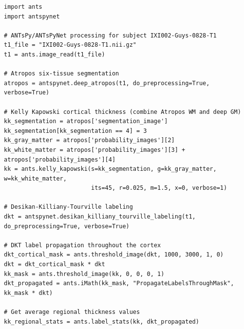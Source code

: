 \documentclass[
  12pt,
]{article}
\begin{document}
\vspace{10mm}


\begin{lstlisting}
import ants
import antspynet

# ANTsPy/ANTsPyNet processing for subject IXI002-Guys-0828-T1
t1_file = "IXI002-Guys-0828-T1.nii.gz"
t1 = ants.image_read(t1_file)

# Atropos six-tissue segmentation
atropos = antspynet.deep_atropos(t1, do_preprocessing=True, verbose=True)

# Kelly Kapowski cortical thickness (combine Atropos WM and deep GM)
kk_segmentation = atropos['segmentation_image']
kk_segmentation[kk_segmentation == 4] = 3
kk_gray_matter = atropos['probability_images'][2]
kk_white_matter = atropos['probability_images'][3] + atropos['probability_images'][4]
kk = ants.kelly_kapowski(s=kk_segmentation, g=kk_gray_matter, w=kk_white_matter,
                         its=45, r=0.025, m=1.5, x=0, verbose=1)

# Desikan-Killiany-Tourville labeling
dkt = antspynet.desikan_killiany_tourville_labeling(t1, do_preprocessing=True, verbose=True)

# DKT label propagation throughout the cortex
dkt_cortical_mask = ants.threshold_image(dkt, 1000, 3000, 1, 0)
dkt = dkt_cortical_mask * dkt
kk_mask = ants.threshold_image(kk, 0, 0, 0, 1)
dkt_propagated = ants.iMath(kk_mask, "PropagateLabelsThroughMask", kk_mask * dkt)

# Get average regional thickness values
kk_regional_stats = ants.label_stats(kk, dkt_propagated)
\end{lstlisting}
\end{document}
